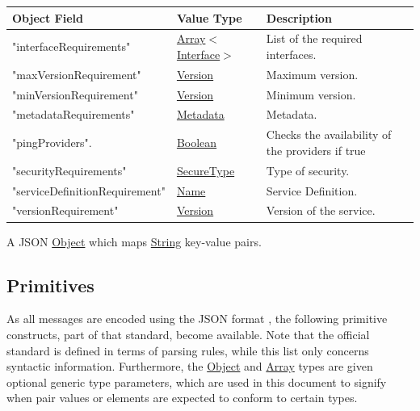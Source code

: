 \documentclass[a4paper]{arrowhead}
\newcommand{\pref}[1]{{\textcolor{ArrowheadGrey}{\hyperref[sec:model:primitives:#1]{#1}}}}
\begin{document}
\begin{table}[ht!]
\begin{tabularx}{\textwidth}{| p{5cm} | p{3.5cm} | X |} \hline
\rowcolor{gray!33} Object Field & Value Type      & Description \\ \hline
"interfaceRequirements"                   & \pref{Array}$<$\pref{Interface}$>$     & List of the required interfaces. \\ \hline
"maxVersionRequirement"                & \pref{Version}     & Maximum version. \\ \hline
"minVersionRequirement"                & \pref{Version}     & Minimum version. \\ \hline
"metadataRequirements"                  & \pref{Metadata}     & Metadata. \\ \hline
"pingProviders".                    & \pref{Boolean} & Checks the availability of the providers if true \\ \hline
"securityRequirements"                    &\pref{SecureType}  & Type of security. \\ \hline
"serviceDefinitionRequirement"         &\pref{Name}        & Service Definition. \\ \hline
"versionRequirement"                   &\pref{Version}     & Version of the service. \\ \hline
\end{tabularx}
\end{table}


A JSON \pref{Object} which maps \pref{String} key-value pairs.

\subsection{Primitives}
\label{sec:model:primitives}

As all messages are encoded using the JSON format \cite{bray2014json}, the following primitive constructs, part of that standard, become available.
Note that the official standard is defined in terms of parsing rules, while this list only concerns syntactic information.
Furthermore, the \pref{Object} and \pref{Array} types are given optional generic type parameters, which are used in this document to signify when pair values or elements are expected to conform to certain types. 
\end{document}
